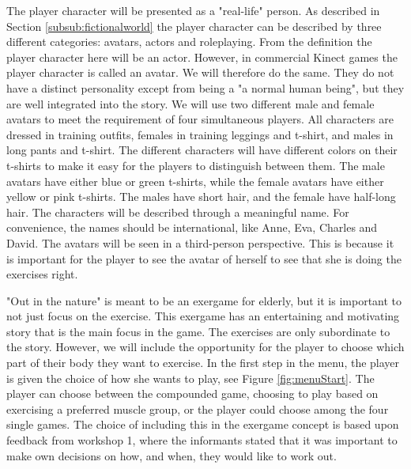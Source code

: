 The player character will be presented as a "real-life" person.  As described in Section \ref{subsub:fictionalworld} the player character can be described by three different categories: avatars, actors and roleplaying. From the definition the player character here will be an actor. However, in commercial Kinect games the player character is called an avatar. We will therefore do the same. They do not have a distinct personality except from being a "a normal human being", but they are well integrated into the story. We will use two different male and female avatars to meet the requirement of four simultaneous players. All characters are dressed in training outfits, females in training leggings and t-shirt, and males in long pants and t-shirt. The different characters will have different colors on their t-shirts to make it easy for the players to distinguish between them. The male avatars have either blue or green t-shirts, while the female avatars have either yellow or pink t-shirts. The males have short hair, and the female have half-long hair. The characters will be described through a meaningful name. For convenience, the names should be international, like Anne, Eva, Charles and David. The avatars will be seen in a third-person perspective. This is because it is important for the player to see the avatar of herself to see that she is doing the exercises right. 

"Out in the nature" is meant to be an exergame for elderly, but it is important to not just focus on the exercise. This exergame has an entertaining and motivating story that is the main focus in the game. The exercises are only subordinate to the story. However, we will include the opportunity for the player to choose which part of their body they want to exercise. In the first step in the menu, the player is given the choice of how she wants to play, see Figure \ref{fig:menuStart}. The player can choose between the compounded game, choosing to play based on exercising a preferred muscle group, or the player could choose among the four single games. The choice of including this in the exergame concept is based upon feedback from workshop 1, where the informants stated that it was important to make own decisions on how, and when, they would like to work out.                     

